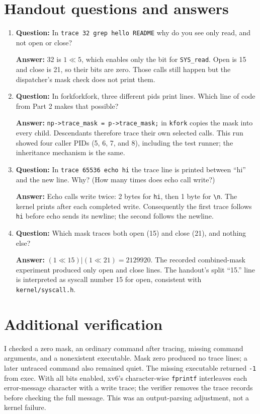 \documentclass[12pt]{article}
\begin{document}
\section{Handout questions and answers}
\begin{enumerate}
\item \textbf{Question:} In \texttt{trace 32 grep hello README} why do you see only read, and not open or close?
\par\textbf{Answer:} 32 is \(1 \ll 5\), which enables only the bit for
\texttt{SYS\_read}. Open is 15 and close is 21, so their bits are zero.
Those calls still happen but the dispatcher's mask check does not print them.

\item \textbf{Question:} In forkforkfork, three different pids print lines. Which line of code from Part 2 makes that possible?
\par\textbf{Answer:} \texttt{np->trace\_mask = p->trace\_mask;} in
\texttt{kfork} copies the mask into every child. Descendants therefore trace
their own selected calls. This run showed four caller PIDs (5, 6, 7, and 8),
including the test runner; the inheritance mechanism is the same.

\item \textbf{Question:} In \texttt{trace 65536 echo hi} the trace line is printed between ``hi'' and the new line. Why? (How many times does echo call write?)
\par\textbf{Answer:} Echo calls write twice: 2 bytes for \texttt{hi}, then
1 byte for \texttt{\textbackslash n}. The kernel prints after each completed
write. Consequently the first trace follows \texttt{hi} before echo sends
its newline; the second follows the newline.

\item \textbf{Question:} Which mask traces both open (15) and close (21), and nothing else?
\par\textbf{Answer:} \((1 \ll 15) | (1 \ll 21) = 2129920\).
The recorded combined-mask experiment produced only open and close lines.
The handout's split ``15.'' line is interpreted as syscall number 15 for
open, consistent with \texttt{kernel/syscall.h}.
\end{enumerate}

\section{Additional verification}
I checked a zero mask, an ordinary command after tracing, missing command
arguments, and a nonexistent executable. Mask zero produced no trace lines;
a later untraced command also remained quiet. The missing executable
returned \texttt{-1} from exec. With all bits enabled, xv6's character-wise
\texttt{fprintf} interleaves each error-message character with a write trace;
the verifier removes the trace records before checking the full message.
This was an output-parsing adjustment, not a kernel failure.
\end{document}
